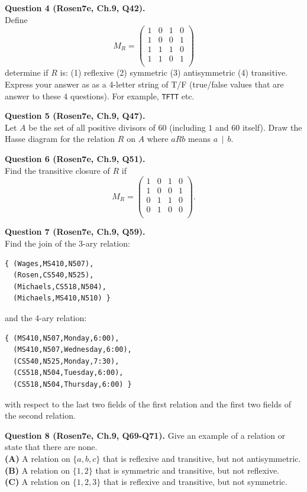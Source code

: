 \documentclass[jou]{apa6}
\begin{document}
\vspace{6pt}
{\bf Question 4 (Rosen7e, Ch.9, Q42).}\\
Define
$$M_R = \left( \begin{array}{cccc}
1 & 0 & 1 & 0 \\
1 & 0 & 0 & 1 \\
1 & 1 & 1 & 0 \\
1 & 1 & 0 & 1 \\
\end{array} \right)$$
determine if $R$ is: (1) reflexive (2) symmetric (3) antisymmetric (4) transitive.
Express your answer as as a 4-letter string of T/F (true/false values that are 
answer to these $4$ questions). For example, 
{\tt TFTT} etc.


\vspace{6pt}
{\bf Question 5 (Rosen7e, Ch.9, Q47).}\\
Let $A$ be the set of all positive divisors of $60$ (including $1$ and $60$ itself). 
Draw the Hasse diagram for the relation $R$ on $A$ where $aRb$ means $a\,\mid\,b$.

\vspace{6pt}
{\bf Question 6 (Rosen7e, Ch.9, Q51).}\\
Find the transitive closure of $R$ if 
$$M_R  = \left( \begin{array}{cccc}
1 & 0 & 1 & 0 \\
1 & 0 & 0 & 1 \\
0 & 1 & 1 & 0 \\
0 & 1 & 0 & 0 \\
\end{array} \right).$$

\vspace{6pt}
{\bf Question 7 (Rosen7e, Ch.9, Q59).}\\
Find the join of the 3-ary relation:
\begin{verbatim}
{ (Wages,MS410,N507),
  (Rosen,CS540,N525),
  (Michaels,CS518,N504),
  (Michaels,MS410,N510) }
\end{verbatim}
and the 4-ary relation:
\begin{verbatim}
{ (MS410,N507,Monday,6:00), 
  (MS410,N507,Wednesday,6:00), 
  (CS540,N525,Monday,7:30),
  (CS518,N504,Tuesday,6:00), 
  (CS518,N504,Thursday,6:00) }
\end{verbatim}
with respect to the last two fields of the first relation and 
the first two fields of the second relation. 

\vspace{6pt}
{\bf Question 8 (Rosen7e, Ch.9, Q69-Q71).}
Give an example of a relation or state that there are none.\\
{\bf (A)} A relation on $\{a, b, c\}$ that is reflexive and transitive, but not antisymmetric.\\
{\bf (B)} A relation on $\{1, 2\}$ that is symmetric and transitive, but not reflexive.\\
{\bf (C)} A relation on $\{1, 2, 3\}$ that is reflexive and transitive, but not symmetric.
\end{document}
